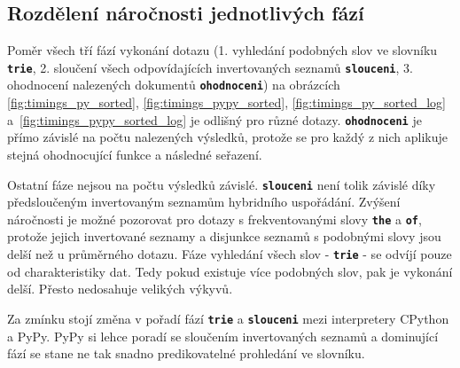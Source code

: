 \documentclass[11pt,letterpaper,oneside,openright]{book}
\newcommand{\bftt}[1]{\texttt{\textbf{#1}}}
\begin{document}
\subsection{Rozdělení náročnosti jednotlivých fází} \label{sec:timings_query_parts}
Poměr všech tří fází vykonání dotazu (1. vyhledání podobných slov ve slovníku
\bftt{trie}, 2. sloučení všech odpovídajících invertovaných seznamů
\bftt{slouceni}, 3. ohodnocení nalezených dokumentů \bftt{ohodnoceni}) na
obrázcích \ref{fig:timings_py_sorted}, \ref{fig:timings_pypy_sorted},
\ref{fig:timings_py_sorted_log} a~\ref{fig:timings_pypy_sorted_log} je odlišný
pro různé dotazy. \bftt{ohodnoceni} je přímo závislé na počtu nalezených
výsledků, protože se pro každý z nich aplikuje stejná ohodnocující funkce a
následné seřazení.

Ostatní fáze nejsou na počtu výsledků závislé. \bftt{slouceni} není tolik
závislé díky předsloučeným invertovaným seznamům hybridního uspořádání. Zvýšení
náročnosti je možné pozorovat pro dotazy s frekventovanými slovy \bftt{the} a
\bftt{of}, protože jejich invertované seznamy a disjunkce seznamů s podobnými
slovy jsou delší než u průměrného dotazu. Fáze vyhledání všech slov -
\bftt{trie} - se odvíjí pouze od charakteristiky dat. Tedy pokud existuje více
podobných slov, pak je vykonání delší. Přesto nedosahuje velikých výkyvů.

Za zmínku stojí změna v pořadí fází \bftt{trie} a \bftt{slouceni} mezi
interpretery CPython a PyPy. PyPy si lehce poradí se sloučením invertovaných
seznamů a dominující fází se stane ne tak snadno predikovatelné prohledání ve
slovníku.


\end{document}
